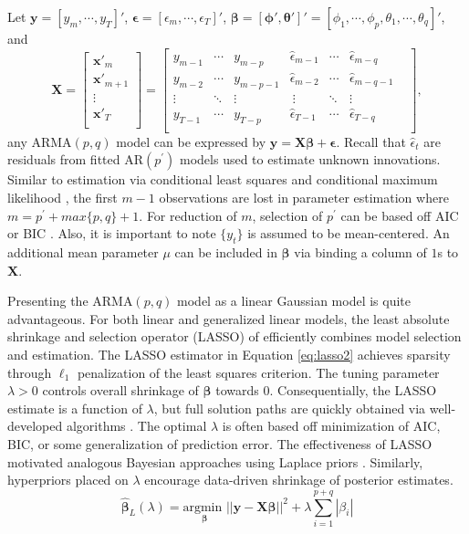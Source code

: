 Let $\bm{y}=[y_{m},\cdots,y_T]'$, $\bm{\epsilon}=[\epsilon_{m},\cdots,\epsilon_T]'$, $\bm{\beta}=[\bm{\phi}',\bm{\theta}']'=[\phi_1,\cdots,\phi_p,\theta_1,\cdots,\theta_q]'$, and 
\begin{equation*}
\bm{X}=\begin{bmatrix} \bm{x}'_{m}  \\
					\bm{x}'_{m+1}  \\
					\vdots \\
					\bm{x}'_{T} \\
	\end{bmatrix} =
	\begin{bmatrix} y_{m-1} & \cdots & y_{m-p} &
					\hat{\epsilon}_{m-1} & \cdots & \hat{\epsilon}_{m-q} \\
					y_{m-2} & \cdots & y_{m-p-1} &
					\hat{\epsilon}_{m-2} & \cdots & \hat{\epsilon}_{m-q-1} \\
					\vdots & \ddots & \vdots &\
					\vdots & \ddots & \vdots & \\
					y_{T-1} & \cdots & y_{T-p} &
					\hat{\epsilon}_{T-1} & \cdots & \hat{\epsilon}_{T-q} \\
	\end{bmatrix},
\end{equation*}
any ARMA$(p,q)$ model can be expressed by $\bm{y}=\bm{X}\bm{\beta}+\bm{\epsilon}$. Recall that $\hat{\epsilon}_t$ are residuals from fitted AR$(p^\prime)$ models used to estimate unknown innovations. Similar to estimation via conditional least squares and conditional maximum likelihood \citep{Hamilton1994}, the first $m-1$ observations are lost in parameter estimation where $m=p^\prime+max\{p,q\}+1$. For reduction of $m$, selection of $p^\prime$ can be based off AIC or BIC  \citep{Hannan1984a,Chen2011}. Also, it is important to note $\{y_t\}$ is assumed to be mean-centered. An additional mean parameter $\mu$ can be included in $\bm{\beta}$ via  binding a column of $1$s to $\bm{X}$.

Presenting the ARMA$(p,q)$ model as a linear Gaussian model is quite advantageous. For both linear and generalized linear models, the least absolute shrinkage and selection operator (LASSO) of \cite{Tibshirani1996} efficiently combines model selection and estimation. The LASSO estimator in Equation \ref{eq:lasso2} achieves sparsity through $\ell_1$ penalization of the least squares criterion.  The tuning parameter $\lambda >0$ controls overall shrinkage of $\bm{\beta}$ towards 0. Consequentially, the LASSO estimate is a function of $\lambda$, but full solution paths are quickly obtained via well-developed algorithms \citep{Efron2004}. The optimal $\lambda$ is often based off minimization of AIC, BIC, or some generalization of prediction error. The effectiveness of LASSO motivated analogous Bayesian approaches using Laplace priors \citep{Park2008, Yuan2005}. Similarly, hyperpriors placed on $\lambda$ encourage data-driven shrinkage of posterior estimates.
\begin{equation}
\label{eq:lasso2}
\hat{\bm{\beta}}_{L} (\lambda)= \underset{\bm{\beta}}{\textrm{argmin }}  ||\bm{y}-\bm{X}\bm{\beta}||^2 + \lambda \sum\limits_{i=1}^{p+q}|\beta_i|
\end{equation}

